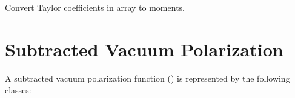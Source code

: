 \documentclass[letterpaper,10pt,english]{sphinxmanual}
\begin{document}

\begin{fulllineitems}
\label{g2tools:g2tools.taylor2mom}
Convert Taylor coefficients in array  to moments.

\end{fulllineitems}



\section{Subtracted Vacuum Polarization}
\label{g2tools:subtracted-vacuum-polarization}
A subtracted vacuum polarization function () is
represented by the following classes:
\end{document}
